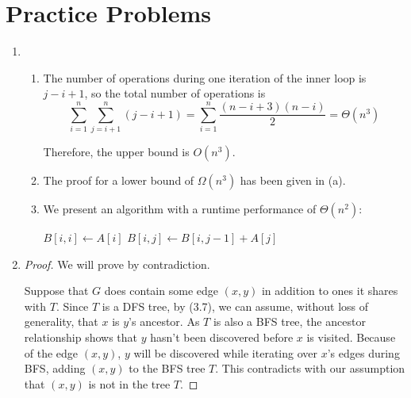 \documentclass{article}
\begin{document}
\section{Practice Problems}

\begin{enumerate}
	\item
	\begin{enumerate}
		\item The number of operations during one iteration of the inner loop is $j - i + 1$, so the total number of operations is
		\[
			\sum_{i = 1}^n \sum_{j = i + 1}^n (j - i + 1) = \sum_{i = 1}^n \frac{(n - i + 3)(n - i)}{2} = \Theta(n^3)
		\]
		
		Therefore, the upper bound is $O(n^3)$.
		
		\item The proof for a lower bound of $\Omega(n^3)$ has been given in (a).
		\item We present an algorithm with a runtime performance of $\Theta(n^2)$:
		\begin{algorithmic}[1]
				\State $B[i, i] \gets A[i]$
					\State $B[i, j] \gets B[i, j - 1] + A[j]$
				\EndFor
			\EndFor
		\end{algorithmic}

	\end{enumerate}
	
	\item
	\begin{proof}
		We will prove by contradiction.
		
		Suppose that $G$ does contain some edge $(x, y)$ in addition to ones it shares with $T$. Since $T$ is a DFS tree, by (3.7), we can assume, without loss of generality, that $x$ is $y$'s ancestor. As $T$ is also a BFS tree, the ancestor relationship shows that $y$ hasn't been discovered before $x$ is visited. Because of the edge $(x, y)$, $y$ will be discovered while iterating over $x$'s edges during BFS, adding $(x, y)$ to the BFS tree $T$. This contradicts with our assumption that $(x, y)$ is not in the tree $T$.
	\end{proof}
\end{enumerate}
\end{document}
